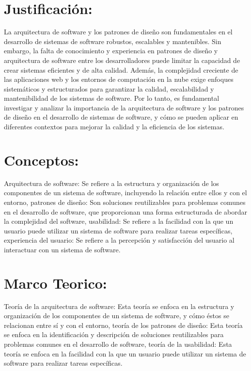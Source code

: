 \documentclass[twocolumn]{article}
\begin{document}
\section{Justificación:}
La arquitectura de software y los patrones de diseño son fundamentales en el desarrollo de sistemas de software robustos, escalables y mantenibles. Sin embargo, la falta de conocimiento y experiencia en patrones de diseño y arquitectura de software entre los desarrolladores puede limitar la capacidad de crear sistemas eficientes y de alta calidad.
Además, la complejidad creciente de las aplicaciones web y los entornos de computación en la nube exige enfoques sistemáticos y estructurados para garantizar la calidad, escalabilidad y mantenibilidad de los sistemas de software.
Por lo tanto, es fundamental investigar y analizar la importancia de la arquitectura de software y los patrones de diseño en el desarrollo de sistemas de software, y cómo se pueden aplicar en diferentes contextos para mejorar la calidad y la eficiencia de los sistemas.

\section{Conceptos:}
Arquitectura de software: Se refiere a la estructura y organización de los componentes de un sistema de software, incluyendo la relación entre ellos y con el entorno, patrones de diseño: Son soluciones reutilizables para problemas comunes en el desarrollo de software, que proporcionan una forma estructurada de abordar la complejidad del software, usabilidad: Se refiere a la facilidad con la que un usuario puede utilizar un sistema de software para realizar tareas específicas, experiencia del usuario: Se refiere a la percepción y satisfacción del usuario al interactuar con un sistema de software.

\section{Marco Teorico:}
Teoría de la arquitectura de software: Esta teoría se enfoca en la estructura y organización de los componentes de un sistema de software, y cómo éstos se relacionan entre sí y con el entorno, teoría de los patrones de diseño: Esta teoría se enfoca en la identificación y descripción de soluciones reutilizables para problemas comunes en el desarrollo de software, teoría de la usabilidad: Esta teoría se enfoca en la facilidad con la que un usuario puede utilizar un sistema de software para realizar tareas específicas.
\end{document}
